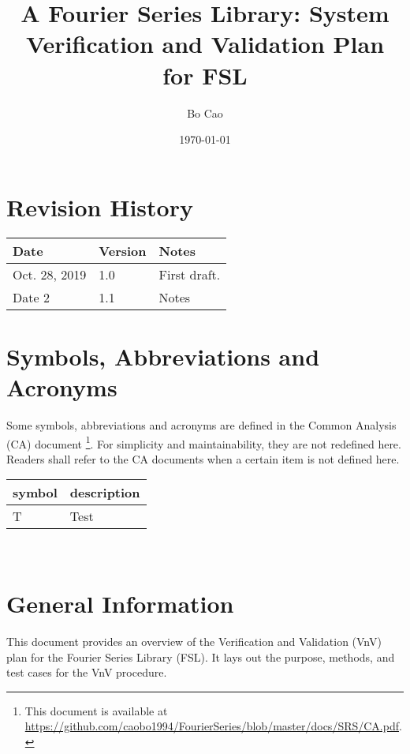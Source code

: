 \documentclass[12pt, titlepage]{article}
\begin{document}
\title{A Fourier Series Library: System Verification and Validation Plan for FSL} 
\author{Bo Cao}
\date{\today}
	
\maketitle


\section{Revision History}

\begin{tabularx}{\textwidth}{p{3cm}p{2cm}X}
\toprule {\bf Date} & {\bf Version} & {\bf Notes}\\
\midrule
Oct. 28, 2019  & 1.0 & First draft.\\
Date 2 & 1.1 & Notes\\
\bottomrule
\end{tabularx}

\newpage

\tableofcontents

\newpage

\section{Symbols, Abbreviations and Acronyms}

Some symbols, abbreviations and acronyms are defined in the Common Analysis (CA) document \footnote{This document is available at \url{https://github.com/caobo1994/FourierSeries/blob/master/docs/SRS/CA.pdf}.}. For simplicity and maintainability, they are not redefined here. Readers shall refer to the CA documents when a certain item is not defined here.

\vspace{1cm}

\renewcommand{\arraystretch}{1.2}
\begin{tabular}{l l} 
  \toprule		
  \textbf{symbol} & \textbf{description}\\
  \midrule 
  T & Test\\
  \bottomrule
\end{tabular}\\

\newpage



\section{General Information}
This document provides an overview of the Verification and Validation (VnV) plan for the Fourier Series Library (FSL). It lays out the purpose, methods, and test cases for the VnV procedure. 
\end{document}
